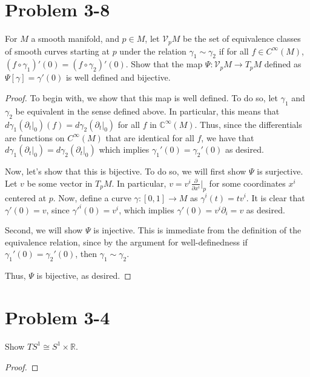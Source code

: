 \documentclass[fontsize=11pt]{scrartcl} %
\numberwithin{equation}{section} %
\numberwithin{figure}{section} %
\numberwithin{table}{section} %
\newcommand{\R}{\mathbb{R}}
\newcommand{\C}{\mathbb{C}}
\begin{document}
\section*{Problem 3-8}
For $M$ a smooth manifold, and $p\in M$, let $\mathscr{V}_pM$ be the set of equivalence
classes of smooth curves starting at $p$ under the relation $\gamma_1 \sim \gamma_2$ if
for all $f\in C^{\infty}(M)$, $(f\circ\gamma_1)'(0) = (f\circ\gamma_2)'(0)$. Show that
the map $\Psi:\mathscr{V}_pM\to T_pM$ defined as $\Psi[\gamma] = \gamma'(0)$ is
well defined and bijective.
\\
\begin{proof}
To begin with, we show that this map is well defined. To do so, let $\gamma_1$ and $\gamma_2$
be equivalent in the sense defined above. In particular, this means that $d\gamma_1(\partial_t|_0)(f) = d\gamma_2(\partial_t|_0)$
for all $f$ in $\C^{\infty}(M)$. Thus, since the differentials are functions on $C^{\infty}(M)$
that are identical for all $f$, we have that $d\gamma_1(\partial_t|_0) = d\gamma_2(\partial_t|_0)$
which implies $\gamma_1'(0) = \gamma_2'(0)$ as desired.

Now, let's show that this is bijective. To do so, we will first show $\Psi$ is surjective.
Let $v$ be some vector in $T_pM$. In particular, $v = v^i\frac{\partial}{\partial x^i}|_p$
for some coordinates $x^i$ centered at $p$. Now, define a curve $\gamma:[0,1]\to M$ as $\gamma^i(t) = tv^i$.
It is clear that $\gamma'(0) = v$, since 
$\gamma'^i(0) = v^i$, which implies $\gamma'(0) = v^i\partial_i = v$ as desired.

Second, we will show $\Psi$ is injective. This is immediate from the definition of the 
equivalence relation, since by the argument for well-definedness if $\gamma_1'(0)=\gamma_2'(0)$,
then $\gamma_1\sim\gamma_2$.

Thus, $\Psi$ is bijective, as desired.
\end{proof}
\section*{Problem 3-4}
Show $TS^1 \cong S^1\times\R$.
\\
\begin{proof}

\end{proof}

\end{document}
